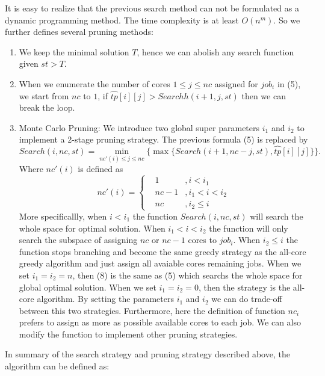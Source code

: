 \documentclass{llncs}
\begin{document}
  It is easy to realize that the previous search method can not be formulated as a dynamic programming method. The time complexity is at least $O(n^m)$. So we further defines several pruning methods:
  \begin{enumerate}
    \item We keep the minimal solution $T$, hence we can abolish any search function given $st > T$.
    \item When we enumerate the number of cores $1\leq j \leq nc$ assigned for $job_i$ in (5), we start from $nc$ to $1$, if $\hat{tp}[i][j] > Searchh(i+1,j,st)$ then we can break the loop.
    \item Monte Carlo Pruning: We introduce two global super parameters $i_1$ and $i_2$ to implement a 2-stage pruning strategy. The previous formula (5) is replaced by
      \begin{equation}
  Search(i,nc,st) = \min_{nc'(i)\leq j \leq nc} \{\max \{Search(i+1,nc-j,st),\hat{tp}[i][j]\}\}.
    \end{equation}
    Where $nc'(i)$ is defined as
    \begin{equation}
      nc'(i) =
      \left\{
        \begin{array}{ccl}
          &1              & ,i < i_1 \\
          &nc - 1         & ,i_1 < i < i_2\\
          &nc             & ,i_2 \leq i
        \end{array}
      \right.
    \end{equation}
    More specificallly, when $i<i_1$ the function  $Search(i,nc,st)$ will search the whole space for optimal solution. When $i_1 < i < i_2$ the function will only search the subspace of assigning $nc$ or $nc-1$  cores to $job_i$. When $i_2 \leq i$ the function stops branching and become the same greedy strategy as the all-core greedy algorithm and just assign all avaiable cores remaining jobs.
    When we set $i_1 = i_2 = n$, then (8) is the same as (5) which searchs the whole space for global optimal solution. When we set $i_1 = i_2 = 0$, then the strategy is the all-core algorithm. By setting the parameters $i_1$ and $i_2$ we can do trade-off between this two strategies. Furthermore, here the definition of function $nc_i$ prefers to assign as more as possible available cores to each job. We can also modify the function to implement other pruning strategies.
  \end{enumerate}
    In summary of the search strategy and pruning strategy described above, the algorithm can be defined as:
\end{document}
